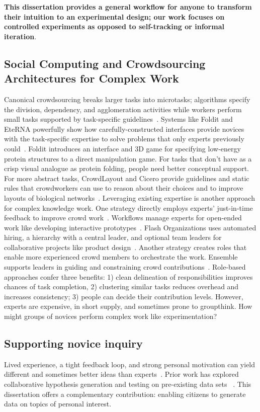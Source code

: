 \textbf{This dissertation provides a general workflow for anyone to transform their intuition to an experimental design; 
our work focuses on controlled experiments as opposed to self-tracking or informal iteration}.

\subsection{Social Computing and Crowdsourcing Architectures for Complex Work}
Canonical crowdsourcing breaks larger tasks into microtasks; algorithms specify the division,
dependency, and agglomeration activities while workers perform small tasks supported by task-specific
guidelines~\cite{kittur2012future}. Systems like Foldit and EteRNA powerfully show 
how carefully-constructed interfaces provide
novices with the task-specific expertise to solve problems that only experts previously 
could~\cite{Cooper2010, Lasecki2012, Lee2014, Zooniverse2007}. 
Foldit introduces an interface and 3D game for specifying low-energy protein structures
to a direct manipulation game. For tasks that don’t have as a crisp visual analogue as protein
folding, people need better conceptual support. For more abstract tasks, CrowdLayout and Cicero
provide guidelines and static rules that crowdworkers can use to reason about their choices and
to improve layouts of biological networks~\cite{Singh:2018:CCD:3173574.3173806, chen2019cicero}.
Leveraging existing expertise is another approach for complex knowledge work. One strategy
directly employs experts’ just-in-time feedback to improve crowd work~\cite{dow2012shepherding}. Workflows manage
experts for open-ended work like developing interactive prototypes~\cite{Retelny2014}. 
Flash Organizations uses automated hiring, a hierarchy with a central leader, and optional 
team leaders for collaborative projects like product design~\cite{Valentine2017}.
Another strategy creates roles that enable more experienced crowd members to orchestrate
the work. Ensemble supports leaders in guiding and constraining crowd 
contributions~\cite{Kim2014e}. Role-based approaches confer three benefits: 1) clean 
delineation of responsibilities improves chances of task completion, 2) clustering similar tasks 
reduces overhead and increases consistency; 3) people can decide their contribution levels. 
However, experts are expensive, in short supply, and sometimes prone to groupthink. 
How might groups of novices perform complex work like experimentation?

\subsection{Supporting novice inquiry}
Lived experience, a tight feedback loop, and strong personal motivation can yield different 
and sometimes better ideas than experts~\cite{VonHippel2005}. Prior work has explored 
collaborative hypothesis generation and testing on pre-existing data sets
~\cite{luther2009pathfinder,willett2011commentspace}. This dissertation offers a 
complementary contribution: enabling citizens to generate data on topics of personal interest.

